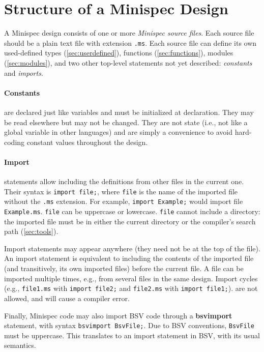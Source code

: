 \section{Structure of a Minispec Design}
\label{sec:design}

A Minispec design consists of one or more \emph{Minispec source files}.
Each source file should be a plain text file with extension \verb|.ms|.
Each source file can define its own used-defined types (\autoref{sec:userdefined}),
functions (\autoref{sec:functions}), modules (\autoref{sec:modules}),
and two other top-level statements not yet described: \emph{constants} and \emph{imports}.

\paragraph{Constants} are declared just like variables and must be initialized at declaration.
They may be read elsewhere but may not be changed. They are not state
(i.e., not like a global variable in other languages) and are simply a convenience
to avoid hard-coding constant values throughout the design.

\paragraph{Import} statements allow including the definitions from other files in the current one.
Their syntax is \verb|import file;|, where \verb|file| is the name of the imported file without the \verb|.ms| extension.
For example, \verb|import Example;| would import file \verb|Example.ms|.
\verb|file| can be uppercase or lowercase.
\verb|file| cannot include a directory: the imported file must be
in either the current directory or the compiler's search path (\autoref{sec:tools}).

Import statements may appear anywhere (they need not be at the top of the file).
An import statement is equivalent to including the contents of the imported file (and transitively, its own imported files)
before the current file.
A file can be imported multiple times, e.g., from several files in the same design.
Import cycles
(e.g., \verb|file1.ms| with \verb|import file2;| and \verb|file2.ms| with \verb|import file1;|).
are not allowed, and will cause a compiler error.

Finally, Minispec code may also import BSV code through a \textbf{bsvimport} statement, with syntax
\verb|bsvimport BsvFile;|. Due to BSV conventions, \verb|BsvFile| must be uppercase.
This translates to an import statement in BSV, with its usual semantics.
